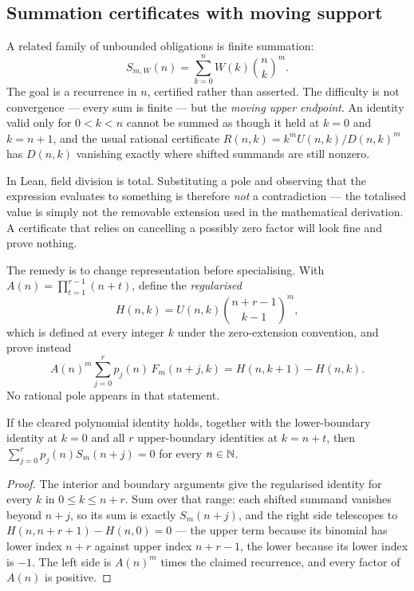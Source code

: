 \subsection{Summation certificates with moving support}
\label{sec:summation}

A related family of unbounded obligations is finite summation:
\[
 S_{m,W}(n)=\sum_{k=0}^{n}W(k)\binom nk^{m}.
\]
The goal is a recurrence in $n$, certified rather than asserted. The difficulty
is not convergence --- every sum is finite --- but the \emph{moving upper
endpoint}. An identity valid only for $0<k<n$ cannot be summed as though it held
at $k=0$ and $k=n+1$, and the usual rational certificate
$R(n,k)=k^mU(n,k)/D(n,k)^m$ has $D(n,k)$ vanishing exactly where shifted
summands are still nonzero.

\begin{remark}
In Lean, field division is total. Substituting a pole and observing that the
expression evaluates to something is therefore \emph{not} a contradiction ---
the totalised value is simply not the removable extension used in the
mathematical derivation. A certificate that relies on cancelling a possibly
zero factor will look fine and prove nothing.
\end{remark}

The remedy is to change representation before specialising. With
$A(n)=\prod_{t=1}^{r-1}(n+t)$, define the \emph{regularised}
\[
 H(n,k)=U(n,k)\binom{n+r-1}{k-1}^{m},
\]
which is defined at every integer $k$ under the zero-extension convention, and
prove instead
\[
 A(n)^{m}\sum_{j=0}^{r}p_j(n)\,F_m(n+j,k)=H(n,k+1)-H(n,k).
\]
No rational pole appears in that statement.

\begin{theorem}
\label{thm:telescope}
If the cleared polynomial identity holds, together with the lower-boundary
identity at $k=0$ and all $r$ upper-boundary identities at $k=n+t$, then
$\sum_{j=0}^{r}p_j(n)S_m(n+j)=0$ for every $n\in\mathbb{N}$.
\end{theorem}
\begin{proof}
The interior and boundary arguments give the regularised identity for every $k$
in $0\le k\le n+r$. Sum over that range: each shifted summand vanishes beyond
$n+j$, so its sum is exactly $S_m(n+j)$, and the right side telescopes to
$H(n,n+r+1)-H(n,0)=0$ --- the upper term because its binomial has lower index
$n+r$ against upper index $n+r-1$, the lower because its lower index is $-1$.
The left side is $A(n)^m$ times the claimed recurrence, and every factor of
$A(n)$ is positive.
\end{proof}


